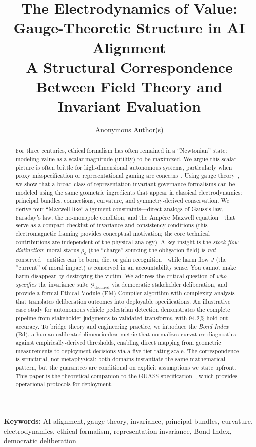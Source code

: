 \documentclass[12pt]{article}
\title{The Electrodynamics of Value:\\
Gauge-Theoretic Structure in AI Alignment\\[0.5em]
\large A Structural Correspondence Between Field Theory and Invariant Evaluation}
\author{Anonymous Author(s)}
\date{}
\begin{document}
\maketitle

\noindent\textbf{Keywords:} AI alignment, gauge theory, invariance, principal bundles, curvature, electrodynamics, ethical formalism, representation invariance, Bond Index, democratic deliberation

\begin{abstract}
For three centuries, ethical formalism has often remained in a ``Newtonian'' state: modeling
value as a scalar magnitude (utility) to be maximized. We argue this scalar picture is often
brittle for high-dimensional autonomous systems, particularly when proxy misspecification or
representational gaming are concerns~\cite{krakovna2020,hubinger2019}. Using gauge theory~\cite{nakahara2003,bleecker1981}, we show that a broad
class of representation-invariant governance formalisms can be modeled using the same geometric
ingredients that appear in classical electrodynamics: principal bundles, connections, curvature,
and symmetry-derived conservation. We derive four ``Maxwell-like'' alignment constraints---direct analogs of Gauss's law, Faraday's law, the no-monopole condition, and the Amp\`{e}re--Maxwell equation---that serve as a compact checklist of invariance and consistency conditions
(this electromagnetic framing provides conceptual motivation; the core technical contributions
are independent of the physical analogy). A key insight is the \emph{stock-flow distinction}: moral
status $\rho_\Psi$ (the ``charge'' sourcing the obligation field) is \emph{not} conserved---entities can be born,
die, or gain recognition---while harm flow $J$ (the ``current'' of moral impact) \emph{is} conserved in an
accountability sense. You cannot make harm disappear by destroying the victim. We address
the critical question of \emph{who specifies} the invariance suite $\mathcal{G}_{\text{declared}}$ via democratic stakeholder
deliberation, and provide a formal Ethical Module (EM) Compiler algorithm with complexity
analysis that translates deliberation outcomes into deployable specifications. An illustrative
case study for autonomous vehicle pedestrian detection demonstrates the complete pipeline from
stakeholder judgments to validated transforms, with 94.2\% hold-out accuracy. To bridge theory
and engineering practice, we introduce the \emph{Bond Index} (Bd), a human-calibrated dimensionless
metric that normalizes curvature diagnostics against empirically-derived thresholds, enabling
direct mapping from geometric measurements to deployment decisions via a five-tier rating
scale. The correspondence is structural, not metaphysical: both domains instantiate the same
mathematical pattern, but the guarantees are conditional on explicit assumptions we state
upfront. This paper is the theoretical companion to the GUASS specification~\cite{bond2025guass}, which provides
operational protocols for deployment.
\end{abstract}
\end{document}

